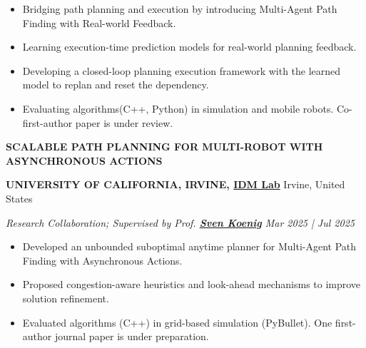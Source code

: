 \documentclass[a4paper,9pt]{extarticle}
\begin{document}
\begin{itemize}
    \item Bridging path planning and execution by introducing Multi-Agent Path Finding with Real-world Feedback. 
    \item Learning execution-time prediction models for real-world planning feedback.
    \item Developing a closed-loop planning execution framework with the learned model to replan and reset the dependency. 
    \item Evaluating algorithms(C++, Python) in simulation and mobile robots. Co-first-author paper is under review.
\end{itemize}
{\textbf{\fontsize{12pt}{4pt}\selectfont S}\textbf{\scshape CALABLE PATH PLANNING FOR MULTI-ROBOT WITH ASYNCHRONOUS ACTIONS}}
\par\vspace{4pt}\noindent
\par\textbf{UNIVERSITY OF CALIFORNIA, IRVINE, {\href{https://idm-lab.org/group.html}{IDM Lab}}} \hfill Irvine, United States  %
\par\textit{Research Collaboration; Supervised by Prof. {\href{https://idm-lab.org/index.html}{\textbf{Sven Koenig}}} \hfill  Mar 2025 | Jul 2025}  %
\begin{itemize}
    \item Developed an unbounded suboptimal anytime planner for Multi-Agent Path Finding with Asynchronous Actions.
    \item Proposed congestion-aware heuristics and look-ahead mechanisms to improve solution refinement.
    \item Evaluated algorithms (C++) in grid-based simulation (PyBullet). One first-author journal paper is under preparation.
\end{itemize}
\end{document}
